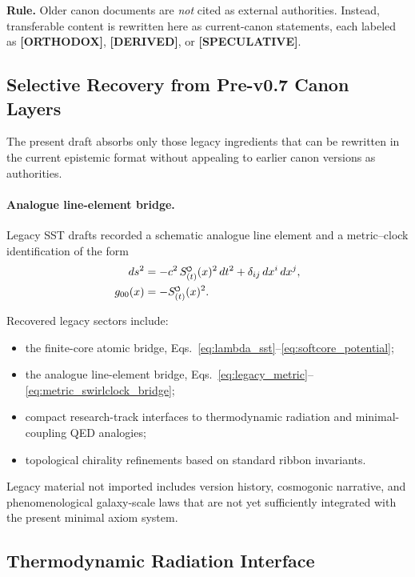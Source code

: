 \documentclass[11pt]{article}
\theoremstyle{definition}
\theoremstyle{plain}
\theoremstyle{remark}
\newcommand{\swirlarrow}{\mathchoice{\mkern-2mu\scriptstyle\boldsymbol{\circlearrowleft}}{\mkern-2mu\scriptstyle\boldsymbol{\circlearrowleft}}{\mkern-2mu\scriptscriptstyle\boldsymbol{\circlearrowleft}}{\mkern-2mu\scriptscriptstyle\boldsymbol{\circlearrowleft}}}
\newcommand{\SwirlClock}{{S_{(t)}^{\swirlarrow}}}
\begin{document}
        \textbf{Rule.}
        Older canon documents are \emph{not} cited as external authorities. Instead, transferable content is
        rewritten here as current-canon statements, each labeled as \textbf{[ORTHODOX]}, \textbf{[DERIVED]},
        or \textbf{[SPECULATIVE]}.

    \subsection{Selective Recovery from Pre-v0.7 Canon Layers}

        The present draft absorbs only those legacy ingredients that can be rewritten in the current epistemic format without appealing to earlier canon versions as authorities.

        \paragraph{Analogue line-element bridge.}
        Legacy SST drafts recorded a schematic analogue line element and a metric--clock identification of the form
        \begin{align}
            ds^2 &= -c^2\,\SwirlClock(x)^2\,dt^2 + \delta_{ij}\,dx^i\,dx^j,
            \label{eq:legacy_metric}\\
            g_{00}(x) &= -\SwirlClock(x)^2 .
            \label{eq:metric_swirlclock_bridge}
        \end{align}

        Recovered legacy sectors include:
        \begin{itemize}
            \item the finite-core atomic bridge, Eqs.~\eqref{eq:lambda_sst}--\eqref{eq:softcore_potential};
            \item the analogue line-element bridge, Eqs.~\eqref{eq:legacy_metric}--\eqref{eq:metric_swirlclock_bridge};
            \item compact research-track interfaces to thermodynamic radiation and minimal-coupling QED analogies;
            \item topological chirality refinements based on standard ribbon invariants.
        \end{itemize}

        Legacy material not imported includes version history, cosmogonic narrative, and phenomenological galaxy-scale laws that are not yet sufficiently integrated with the present minimal axiom system.

    \subsection{Thermodynamic Radiation Interface}
\end{document}
